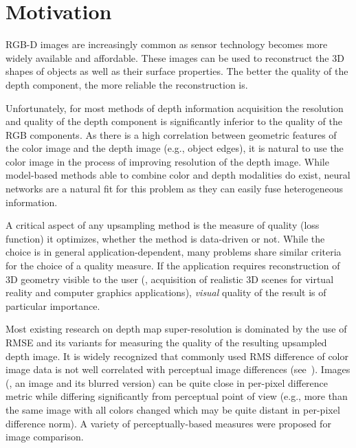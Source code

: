 \section{Motivation}
\label{sec:intro}

RGB-D images are increasingly common as sensor technology becomes more widely available and affordable. These images can be used to reconstruct the 3D shapes of objects as well as their surface properties. The better the quality of the depth component, the more reliable the reconstruction is. 

Unfortunately, for most methods of depth information acquisition the resolution and quality of the depth component is significantly inferior to the quality of the RGB components. As there is a high correlation between geometric features of the color image and the depth image (e.g., object edges), it is natural to use the color image in the process of improving resolution of the depth image. While model-based methods able to combine color and depth modalities do exist, neural networks are a natural fit for this problem as they can easily fuse heterogeneous information.

A critical aspect of any upsampling method is the measure of quality (loss function) it optimizes, whether the method is data-driven or not. While the choice is in general application-dependent, many problems share similar criteria for the choice of a quality measure. If the application requires reconstruction of 3D geometry visible to the user (\eg, acquisition of realistic 3D scenes for virtual reality and computer graphics applications), \emph{visual} quality of the result is of particular importance. 

Most existing research on depth map super-resolution is dominated by the use of RMSE and its variants for measuring the quality of the resulting upsampled depth image.
It is widely recognized that commonly used RMS difference of color image data is not well correlated with perceptual image differences (see~\cite{wang2009mean}). Images (\eg, an image and its blurred version) can be quite close in per-pixel difference metric while differing significantly from perceptual point of view (e.g., more than the same image with all colors changed which may be quite distant in per-pixel difference norm). A variety of perceptually-based measures were proposed for image comparison.  

